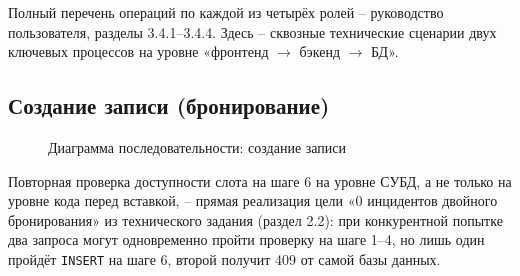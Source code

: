 Полный перечень операций по каждой из четырёх ролей -- руководство
пользователя, разделы 3.4.1--3.4.4. Здесь -- сквозные технические сценарии
двух ключевых процессов на уровне «фронтенд $\to$ бэкенд $\to$ БД».

\subsection{Создание записи (бронирование)}

\begin{figure}[htbp]
\centering
{}
\caption{Диаграмма последовательности: создание записи}
\end{figure}

Повторная проверка доступности слота на шаге 6 на уровне СУБД, а не только
на уровне кода перед вставкой, -- прямая реализация цели «0 инцидентов
двойного бронирования» из технического задания (раздел 2.2): при
конкурентной попытке два запроса могут одновременно пройти проверку на
шаге 1--4, но лишь один пройдёт \texttt{INSERT} на шаге 6, второй получит
409 от самой базы данных.

